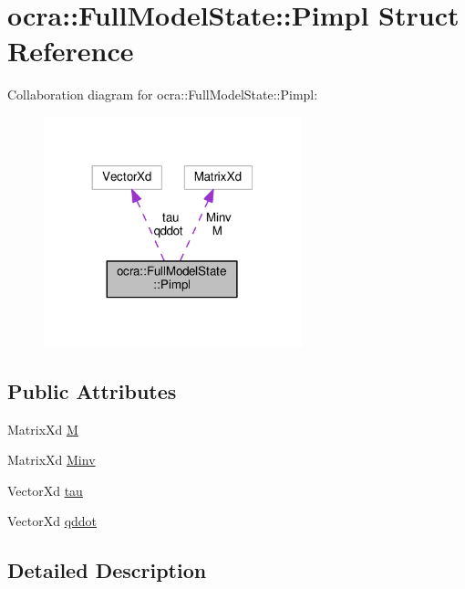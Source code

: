 \hypertarget{structocra_1_1FullModelState_1_1Pimpl}{}\section{ocra\+:\+:Full\+Model\+State\+:\+:Pimpl Struct Reference}
\label{structocra_1_1FullModelState_1_1Pimpl}


Collaboration diagram for ocra\+:\+:Full\+Model\+State\+:\+:Pimpl\+:
\nopagebreak
\begin{figure}[H]
\begin{center}
\leavevmode
\includegraphics[width=212pt]{d9/d3a/structocra_1_1FullModelState_1_1Pimpl__coll__graph}
\end{center}
\end{figure}
\subsection*{Public Attributes}
\begin{DoxyCompactItemize}
\item 
Matrix\+Xd \hyperlink{structocra_1_1FullModelState_1_1Pimpl_a0482896483cb287cfc1066df1326f250}{M}
\item 
Matrix\+Xd \hyperlink{structocra_1_1FullModelState_1_1Pimpl_a66abf4494ddc5e7de0fbdeee4d6404d0}{Minv}
\item 
Vector\+Xd \hyperlink{structocra_1_1FullModelState_1_1Pimpl_a451de435a3d80fdc760ab0d37cbad664}{tau}
\item 
Vector\+Xd \hyperlink{structocra_1_1FullModelState_1_1Pimpl_a9575456409af57d39f990f2dda27c23f}{qddot}
\end{DoxyCompactItemize}


\subsection{Detailed Description}


